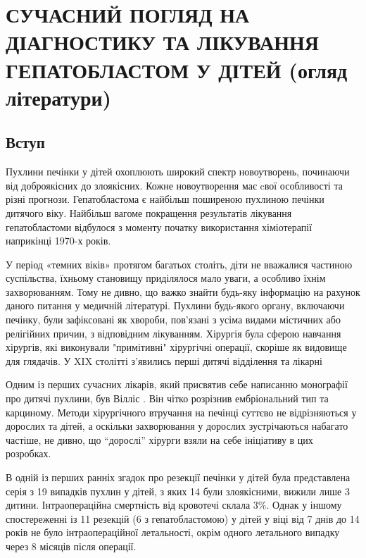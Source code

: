\chapter{СУЧАСНИЙ ПОГЛЯД НА ДІАГНОСТИКУ ТА ЛІКУВАННЯ ГЕПАТОБЛАСТОМ У ДІТЕЙ (огляд літератури)}

\section{Вступ}
Пухлини печінки у дітей охоплюють широкий спектр новоутворень, починаючи від доброякісних до злоякісних. Кожне новоутворення має cвої особливості та різні  прогнози. Гепатобластома є найбільш поширеною пухлиною печінки дитячого віку. Найбільш вагоме покращення результатів лікування гепатобластоми відбулося з моменту початку використання хіміотерапії наприкінці 1970-х років. 

У період «темних віків» протягом багатьох століть, діти не вважалися частиною суспільства, їхньому становищу приділялося мало уваги, а особливо їхнім захворюванням. Тому не дивно, що важко знайти будь-яку інформацію на рахунок даного питання у медичній літературі. Пухлини будь-якого органу, включаючи печінку, були зафіксовані як хвороби, пов'язані з усіма видами містичних або релігійних причин, з відповідним лікуванням. Хірургія була сферою навчання хірургів, які виконували "примітивні" хірургічні операції, скоріше як видовище для глядачів. У XIX столітті з’явились перші дитячі відділення та лікарні

Одним із перших сучасних лікарів, який присвятив себе написанню монографії про дитячі пухлини, був Вілліс \cite{pmid10466608}. Він чітко розрізнив ембріональний тип та карциному. 
Методи хірургічного втручання на печінці суттєво не відрізняються у дорослих та дітей, а оскільки захворювання у дорослих зустрічаються набагато частіше, не дивно, що “дорослі” хірурги взяли на себе ініціативу в цих розробках. 

В одній із перших ранніх згадок про резекції печінки у дітей була представлена серія з 19 випадків пухлин у дітей, з яких 14  були злоякісними,  вижили лише 3 дитини. Інтраопераційна смертність від кровотечі склала 3\%. Однак у іншому спостереженні \cite{pmid10839879} із 11 резекцій (6 з гепатобластомою) у дітей у віці від 7 днів до 14 років не було інтраопераційної летальності, окрім одного летального випадку через 8 місяців після операції. 

